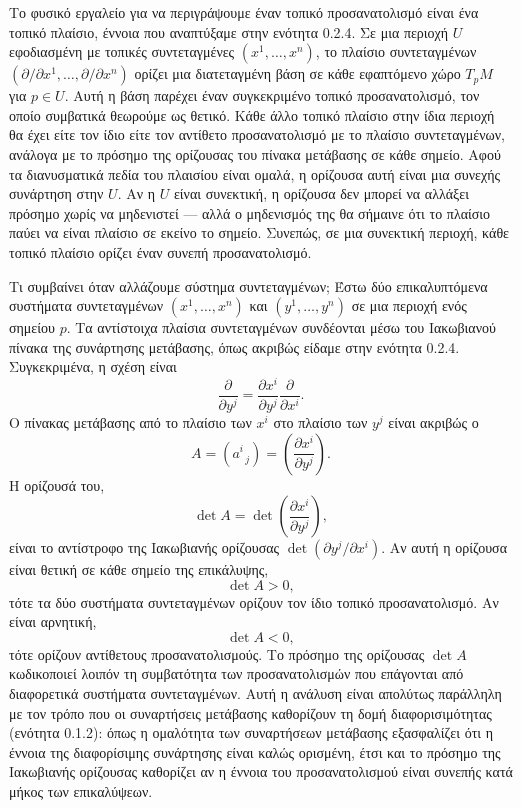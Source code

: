 \documentclass[11pt,a4paper,twoside,openright]{book}
\begin{document}
Το φυσικό εργαλείο για να περιγράψουμε έναν τοπικό προσανατολισμό είναι ένα τοπικό πλαίσιο, έννοια που αναπτύξαμε στην ενότητα 0.2.4. Σε μια περιοχή $U$ εφοδιασμένη με τοπικές συντεταγμένες $(x^1, \dots, x^n)$, το πλαίσιο συντεταγμένων $(\partial / \partial x^1, \dots, \partial / \partial x^n)$ ορίζει μια διατεταγμένη βάση σε κάθε εφαπτόμενο χώρο $T_pM$ για $p \in U$. Αυτή η βάση παρέχει έναν συγκεκριμένο τοπικό προσανατολισμό, τον οποίο συμβατικά θεωρούμε ως θετικό. Κάθε άλλο τοπικό πλαίσιο στην ίδια περιοχή θα έχει είτε τον ίδιο είτε τον αντίθετο προσανατολισμό με το πλαίσιο συντεταγμένων, ανάλογα με το πρόσημο της ορίζουσας του πίνακα μετάβασης σε κάθε σημείο. Αφού τα διανυσματικά πεδία του πλαισίου είναι ομαλά, η ορίζουσα αυτή είναι μια συνεχής συνάρτηση στην $U$. Αν η $U$ είναι συνεκτική, η ορίζουσα δεν μπορεί να αλλάξει πρόσημο χωρίς να μηδενιστεί --- αλλά ο μηδενισμός της θα σήμαινε ότι το πλαίσιο παύει να είναι πλαίσιο σε εκείνο το σημείο. Συνεπώς, σε μια συνεκτική περιοχή, κάθε τοπικό πλαίσιο ορίζει έναν συνεπή προσανατολισμό.

Τι συμβαίνει όταν αλλάζουμε σύστημα συντεταγμένων; Έστω δύο επικαλυπτόμενα συστήματα συντεταγμένων $(x^1, \dots, x^n)$ και $(y^1, \dots, y^n)$ σε μια περιοχή ενός σημείου $p$. Τα αντίστοιχα πλαίσια συντεταγμένων συνδέονται μέσω του Ιακωβιανού πίνακα της συνάρτησης μετάβασης, όπως ακριβώς είδαμε στην ενότητα 0.2.4. Συγκεκριμένα, η σχέση είναι
\[
\frac{\partial}{\partial y^j} = \frac{\partial x^i}{\partial y^j} \frac{\partial}{\partial x^i}.
\]
Ο πίνακας μετάβασης από το πλαίσιο των $x^i$ στο πλαίσιο των $y^j$ είναι ακριβώς ο
\[
A = (a^i_{\;\; j}) = \left( \frac{\partial x^i}{\partial y^j} \right).
\]
Η ορίζουσά του,
\[
\det A = \det \left( \frac{\partial x^i}{\partial y^j} \right),
\]
είναι το αντίστροφο της Ιακωβιανής ορίζουσας $\det(\partial y^j / \partial x^i)$. Αν αυτή η ορίζουσα είναι θετική σε κάθε σημείο της επικάλυψης,
\[
\det A > 0,
\]
τότε τα δύο συστήματα συντεταγμένων ορίζουν τον ίδιο τοπικό προσανατολισμό. Αν είναι αρνητική,
\[
\det A < 0,
\]
τότε ορίζουν αντίθετους προσανατολισμούς. Το πρόσημο της ορίζουσας $\det A$ κωδικοποιεί λοιπόν τη συμβατότητα των προσανατολισμών που επάγονται από διαφορετικά συστήματα συντεταγμένων. Αυτή η ανάλυση είναι απολύτως παράλληλη με τον τρόπο που οι συναρτήσεις μετάβασης καθορίζουν τη δομή διαφορισιμότητας (ενότητα 0.1.2): όπως η ομαλότητα των συναρτήσεων μετάβασης εξασφαλίζει ότι η έννοια της διαφορίσιμης συνάρτησης είναι καλώς ορισμένη, έτσι και το πρόσημο της Ιακωβιανής ορίζουσας καθορίζει αν η έννοια του προσανατολισμού είναι συνεπής κατά μήκος των επικαλύψεων.
\end{document}
